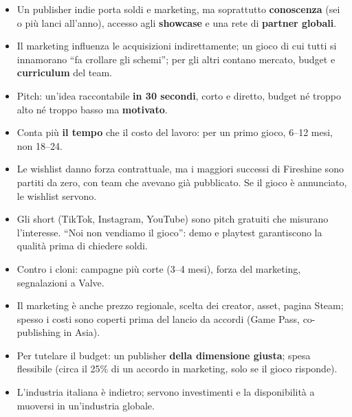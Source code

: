 \begin{itemize}
  \item Un publisher indie porta soldi e marketing, ma soprattutto
        \textbf{conoscenza} (sei o più lanci all'anno), accesso agli
        \textbf{showcase} e una rete di \textbf{partner globali}.
  \item Il marketing influenza le acquisizioni indirettamente; un gioco di cui
        tutti si innamorano ``fa crollare gli schemi''; per gli altri contano
        mercato, budget e \textbf{curriculum} del team.
  \item Pitch: un'idea raccontabile \textbf{in 30 secondi}, corto e diretto,
        budget né troppo alto né troppo basso ma \textbf{motivato}.
  \item Conta più \textbf{il tempo} che il costo del lavoro: per un primo gioco,
        6--12 mesi, non 18--24.
  \item Le wishlist danno forza contrattuale, ma i maggiori successi di
        Fireshine sono partiti da zero, con team che avevano già pubblicato. Se il
        gioco è annunciato, le wishlist servono.
  \item Gli short (TikTok, Instagram, YouTube) sono pitch gratuiti che misurano
        l'interesse. ``Noi non vendiamo il gioco'': demo e playtest garantiscono la
        qualità prima di chiedere soldi.
  \item Contro i cloni: campagne più corte (3--4 mesi), forza del marketing,
        segnalazioni a Valve.
  \item Il marketing è anche prezzo regionale, scelta dei creator, asset, pagina
        Steam; spesso i costi sono coperti prima del lancio da accordi (Game Pass,
        co-publishing in Asia).
  \item Per tutelare il budget: un publisher \textbf{della dimensione giusta};
        spesa flessibile (circa il 25\% di un accordo in marketing, solo se il
        gioco risponde).
  \item L'industria italiana è indietro; servono investimenti e la disponibilità
        a muoversi in un'industria globale.
\end{itemize}
